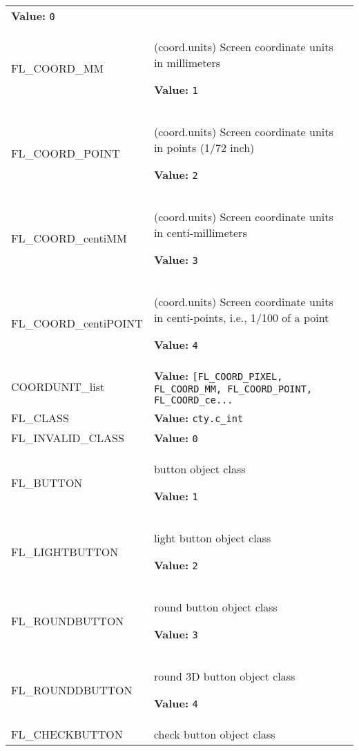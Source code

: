 \begin{longtable}{|p{\varnamewidth}|p{\vardescrwidth}|l}
\textbf{Value:} 
{\tt 0}&\\
\cline{1-2}
\raggedright F\-L\-\_\-C\-O\-O\-R\-D\-\_\-M\-M\- & \raggedright (coord.units) Screen coordinate units in millimeters

\textbf{Value:} 
{\tt 1}&\\
\cline{1-2}
\raggedright F\-L\-\_\-C\-O\-O\-R\-D\-\_\-P\-O\-I\-N\-T\- & \raggedright (coord.units) Screen coordinate units in points
(1/72 inch)

\textbf{Value:} 
{\tt 2}&\\
\cline{1-2}
\raggedright F\-L\-\_\-C\-O\-O\-R\-D\-\_\-c\-e\-n\-t\-i\-M\-M\- & \raggedright (coord.units) Screen coordinate units in
centi-millimeters

\textbf{Value:} 
{\tt 3}&\\
\cline{1-2}
\raggedright F\-L\-\_\-C\-O\-O\-R\-D\-\_\-c\-e\-n\-t\-i\-P\-O\-I\-N\-T\- & \raggedright (coord.units) Screen coordinate units in centi-points,
i.e., 1/100 of a point

\textbf{Value:} 
{\tt 4}&\\
\cline{1-2}
\raggedright C\-O\-O\-R\-D\-U\-N\-I\-T\-\_\-l\-i\-s\-t\- & \raggedright \textbf{Value:} 
{\tt [FL\_COORD\_PIXEL, FL\_COORD\_MM, FL\_COORD\_POINT, FL\_COORD\_ce\texttt{...}}&\\
\cline{1-2}
\raggedright F\-L\-\_\-C\-L\-A\-S\-S\- & \raggedright \textbf{Value:} 
{\tt cty.c\_int}&\\
\cline{1-2}
\raggedright F\-L\-\_\-I\-N\-V\-A\-L\-I\-D\-\_\-C\-L\-A\-S\-S\- & \raggedright \textbf{Value:} 
{\tt 0}&\\
\cline{1-2}
\raggedright F\-L\-\_\-B\-U\-T\-T\-O\-N\- & \raggedright button object class

\textbf{Value:} 
{\tt 1}&\\
\cline{1-2}
\raggedright F\-L\-\_\-L\-I\-G\-H\-T\-B\-U\-T\-T\-O\-N\- & \raggedright light button object class

\textbf{Value:} 
{\tt 2}&\\
\cline{1-2}
\raggedright F\-L\-\_\-R\-O\-U\-N\-D\-B\-U\-T\-T\-O\-N\- & \raggedright round button object class

\textbf{Value:} 
{\tt 3}&\\
\cline{1-2}
\raggedright F\-L\-\_\-R\-O\-U\-N\-D\-3\-D\-B\-U\-T\-T\-O\-N\- & \raggedright round 3D button object class

\textbf{Value:} 
{\tt 4}&\\
\cline{1-2}
\raggedright F\-L\-\_\-C\-H\-E\-C\-K\-B\-U\-T\-T\-O\-N\- & \raggedright check button object class


\end{longtable}
